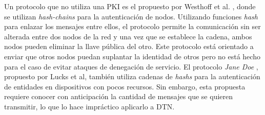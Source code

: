 Un protocolo que no utiliza una PKI es el propuesto por Westhoff et al.
\cite{DBLP:conf/sacrypt/WeimerskirchW03}, donde se utilizan \textit{hash-chains}
para la autenticación de nodos. Utilizando funciones \textit{hash} para enlazar
los mensajes entre ellos, el protocolo permite la comunicación sin ser alterada
entre dos nodos de la red y una vez que se establece la cadena, ambos nodos
pueden eliminar la llave pública del otro. Este protocolo está orientado a
enviar que otros nodos puedan suplantar la identidad de otros pero no está
hecho para el caso de evitar ataques de denegación de servicio.  El protocolo
\textit{Jane Doe} \cite{DBLP:journals/iacr/LucksZWW09}, propuesto por Lucks et
al, también utiliza cadenas de \textit{hashs} para la autenticación de entidades
en dispositivos con pocos recursos. Sin embargo, esta propuesta requiere conocer
con anticipación la cantidad de mensajes que se quieren transmitir, lo que lo
hace impráctico aplicarlo a DTN.










